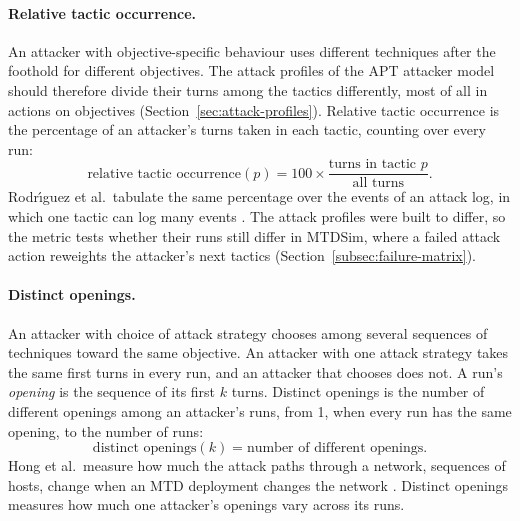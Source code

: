 \documentclass{cshonours}
\begin{document}
\paragraph{Relative tactic occurrence.}
An attacker with objective-specific behaviour uses different techniques after the foothold for different objectives. The attack profiles of the APT attacker model should therefore
divide their turns among the tactics differently, most of all in actions on
objectives (Section~\ref{sec:attack-profiles}). Relative tactic occurrence is
the percentage of an attacker's turns taken in each tactic, counting over
every run:
\begin{equation}
  \text{relative tactic occurrence}(p) =
  100 \times \frac{\text{turns in tactic } p}{\text{all turns}}.
  \label{eq:rto}
\end{equation}
Rodr\'{\i}guez et al.\ tabulate the same percentage over the events of an
attack log, in which one tactic can log many events
\citep[Table~3]{rodriguez2024}. The attack profiles were built to differ, so
the metric tests whether their runs still differ in MTDSim, where a failed
attack action reweights the attacker's next tactics
(Section~\ref{subsec:failure-matrix}).

\paragraph{Distinct openings.}
An attacker with choice of attack strategy chooses among several sequences of techniques toward the same objective. An attacker with one attack strategy takes the same first turns in every run, and an
attacker that chooses does not. A run's \emph{opening} is the sequence of its
first $k$ turns. Distinct openings is the number of different openings among
an attacker's runs, from 1, when every run has the same opening, to the number
of runs:
\begin{equation}
  \text{distinct openings}(k) =
  \text{number of different openings}.
  \label{eq:apv}
\end{equation}
Hong et al.\ measure how much the attack paths through a network, sequences of
hosts, change when an MTD deployment changes the network \citep{hong2018}.
Distinct openings measures how much one attacker's openings vary across its
runs.
\end{document}
